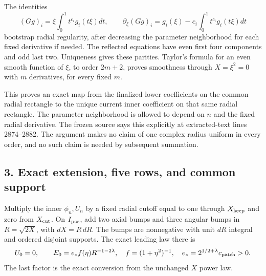 \documentclass[10pt,a4paper]{article}
\begin{document}
The identities \[
(Gg)_i=\xi\int_0^1t^{c_i}g_i(t\xi)dt,
\qquad
\partial_\xi(Gg)_i=g_i(\xi)-c_i\int_0^1t^{c_i}g_i(t\xi)dt
\] bootstrap radial regularity, after decreasing the parameter neighborhood for each fixed derivative if needed. The reflected equations have even first four components and odd last two. Uniqueness gives these parities. Taylor's formula for an even smooth function of \(\xi\), to order \(2m+2\), proves smoothness through \(X=\xi^2=0\) with \(m\) derivatives, for every fixed \(m\).

This proves an exact map from the finalized lower coefficients on the common radial rectangle to the unique current inner coefficient on that same radial rectangle. The parameter neighborhood is allowed to depend on \(n\) and the fixed radial derivative. The frozen source says this explicitly at extracted-text lines 2874--2882. The argument makes no claim of one complex radius uniform in every order, and no such claim is needed by subsequent summation.

\subsection{3. Exact extension, five rows, and common support}\label{gclosure:exact-extension-five-rows-and-common-support}

Multiply the inner \(\phi_n,U_n\) by a fixed radial cutoff equal to one through \(X_{\rm keep}\) and zero from \(X_{\rm cut}\). On \(I_{\rm pos}\), add two axial bumps and three angular bumps in \(R=\sqrt{2X}\), with \(dX=R\,dR\). The bumps are nonnegative with unit \(dR\) integral and ordered disjoint supports. The exact leading law there is \[
U_0=0,\qquad E_0=e_*f(\eta)R^{-1-2\lambda},
\quad f=(1+\eta^2)^{-1},\quad
e_*=2^{1/2+\lambda}c_{\rm patch}>0.
\] The last factor is the exact conversion from the unchanged \(X\) power law.
\end{document}

